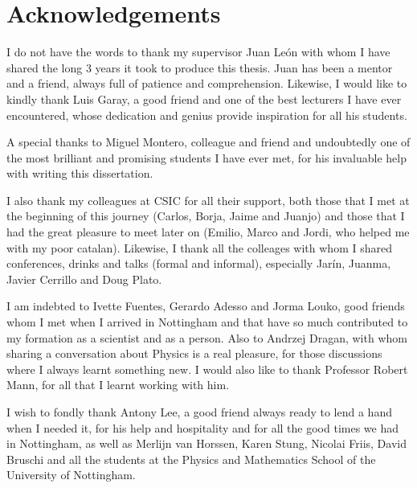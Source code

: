 \thispagestyle{empty}



\cleardoublepage

\chapter*{Acknowledgements}
\thispagestyle{empty}


I do not have the words to thank my supervisor Juan Le\'on with whom I have shared the long 3 years it took to produce this thesis. Juan has been a mentor and a friend, always full of patience and comprehension. Likewise, I would like to kindly thank Luis Garay, a good friend and one of the best lecturers I have ever encountered, whose dedication and genius provide inspiration for all his students.

\medskip

A special thanks to Miguel Montero, colleague and friend and undoubtedly one of the most brilliant and promising students I have ever met, for his invaluable help with writing this dissertation.

\medskip

I also thank my colleagues at CSIC for all their support, both those that I met at the beginning of this journey (Carlos, Borja, Jaime and Juanjo) and those that I had the great pleasure to meet later on (Emilio, Marco and Jordi, who helped me with my poor catalan). Likewise, I thank all the colleages with whom I shared conferences, drinks and  talks (formal and informal), especially Jar\'in, Juanma, Javier Cerrillo and Doug Plato.

\medskip

I am indebted to Ivette Fuentes, Gerardo Adesso and Jorma Louko, good friends whom I met when I arrived in Nottingham and that have so much contributed to my formation as a scientist and as a person.  Also to Andrzej Dragan, with whom sharing a conversation about Physics is a real pleasure, for those discussions where I always learnt something new. I would also like to thank Professor Robert Mann, for all that I learnt working with him.

\medskip

I wish to fondly thank Antony Lee, a good friend always ready to lend a hand when I needed it, for his help and hospitality and for all the good times we had in Nottingham, as well as Merlijn van Horssen, Karen Stung, Nicolai Friis, David Bruschi and all the students at the Physics and Mathematics School of the University of Nottingham. 

